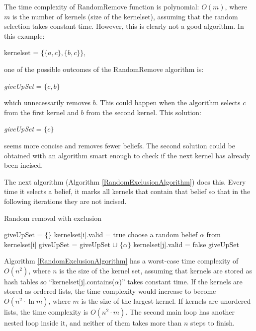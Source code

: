 The time complexity of RandomRemove function is polynomial: $O(m)$, where $m$ is the number of kernels (size of the kernelset), assuming that the random selection takes constant time. However, this is clearly not a good algorithm. In this example:
\begin{center}
kernelset = $\lbrace \lbrace a, c \rbrace, \lbrace b, c \rbrace \rbrace$, 
\end{center}
one of the possible outcomes of the RandomRemove algorithm is:
\begin{center}
\textit{giveUpSet} = $\lbrace c, b \rbrace$
\end{center}
which unnecessarily removes $b$. This could happen when the algorithm selects $c$ from the first kernel and $b$ from the second kernel. This solution:
\begin{center}
\textit{giveUpSet} = $\lbrace c \rbrace$
\end{center}
seems more concise and removes fewer beliefs. The second solution could be obtained with an algorithm smart enough to check if the next kernel has already been incised. 

The next algorithm (Algorithm \ref{RandomExclusionAlgorithm}) does this. Every time it selects a belief, it marks all kernels that contain that belief so that in the following iterations they are not incised. 

\begin{algorithm}
\caption{Random removal with exclusion}
\label{RandomExclusionAlgorithm}
\begin{algorithmic}[1]
\State giveUpSet = $\lbrace \rbrace$
\State kernelset[i].valid = true
\EndFor \State
{}
\State choose a random belief $\alpha$ from kernelset[i]
\State giveUpSet = giveUpSet $\cup$ $\lbrace \alpha \rbrace$
\State kernelset[j].valid = false
\EndIf
\EndFor
\EndIf
\EndFor \State
\Return giveUpSet
\EndFunction
\end{algorithmic}
\end{algorithm}

Algorithm \ref{RandomExclusionAlgorithm} has a worst-case time complexity of $O(n^2)$, where $n$ is the size of the kernel set, assuming that kernels are stored as hash tables so ``kernelset[j].contains($\alpha$)'' takes constant time. If the kernels are stored as ordered lists, the time complexity would increase to become $O(n^2 \cdot \ln m)$, where $m$ is the size of the largest kernel. If kernels are unordered lists, the time complexity is $O(n^2 \cdot m)$. The second main loop has another nested loop inside it, and neither of them takes more than $n$ steps to finish. 

